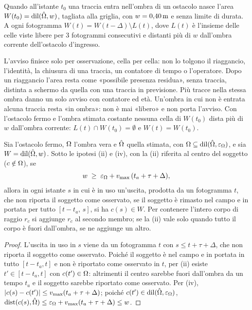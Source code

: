 \begin{definizione}\label{def:occ-avviso}
Quando all'istante $t_0$ una traccia entra nell'ombra di un ostacolo nasce l'area $W(t_0)=\operatorname{dil}(\hat{\Omega},w)$, tagliata alla griglia, con $w=0{,}40\,\mathrm{m}$ e senza limite di durata. A ogni fotogramma $W(t)=W(t-\Delta)\setminus L(t)$, dove $L(t)$ è l'insieme delle celle viste libere per 3 fotogrammi consecutivi e distanti più di $w$ dall'ombra corrente dell'ostacolo d'ingresso.
\end{definizione}

L'avviso finisce solo per osservazione, cella per cella: non lo tolgono il riaggancio, l'identità, la chiusura di una traccia, un contatore di tempo o l'operatore. Dopo un riaggancio l'area resta come «possibile presenza residua», senza traccia, distinta a schermo da quella con una traccia in previsione. Più tracce nella stessa ombra danno un solo avviso con contatore ed età. Un'ombra in cui non è entrata alcuna traccia resta «in ombra»: non è mai «libero» e non porta l'avviso. Con l'ostacolo fermo e l'ombra stimata costante nessuna cella di $W(t_0)$ dista più di $w$ dall'ombra corrente: $L(t)\cap W(t_0)=\emptyset$ e $W(t)=W(t_0)$.

\begin{proposizione}\label{prop:occ-fascia}
Sia l'ostacolo fermo, $\Omega$ l'ombra vera e $\hat{\Omega}$ quella stimata, con $\Omega\subseteq\operatorname{dil}(\hat{\Omega},\varepsilon_\Omega)$, e sia $W=\operatorname{dil}(\hat{\Omega},w)$. Sotto le ipotesi (ii) e (iv), con la (ii) riferita al centro del soggetto ($c\notin\Omega$), se
\begin{equation}\label{eq:occ-fascia}
w\;\ge\;\varepsilon_\Omega+v_{\max}\,(t_a+\tau+\Delta),
\end{equation}
allora in ogni istante $s$ in cui è in uso un'uscita, prodotta da un fotogramma $t$, che non riporta il soggetto come osservato, se il soggetto è rimasto nel campo e in portata per tutto $[t-t_a,\,s]$, si ha $c(s)\in W$. Per contenere l'intero corpo di raggio $r_c$ si aggiunge $r_c$ al secondo membro; se la (ii) vale solo quando tutto il corpo è fuori dall'ombra, se ne aggiunge un altro. 
\end{proposizione}
\begin{proof}
L'uscita in uso in $s$ viene da un fotogramma $t$ con $s\le t+\tau+\Delta$, che non riporta il soggetto come osservato. Poiché il soggetto è nel campo e in portata in tutto $[t-t_a,t]$ e non è riportato come osservato in $t$, per (ii) esiste $t'\in[t-t_a,t]$ con $c(t')\in\Omega$: altrimenti il centro sarebbe fuori dall'ombra da un tempo $t_a$ e il soggetto sarebbe riportato come osservato. Per (iv), $|c(s)-c(t')|\le v_{\max}(t_a+\tau+\Delta)$; poiché $c(t')\in\operatorname{dil}(\hat{\Omega},\varepsilon_\Omega)$, $\operatorname{dist}(c(s),\hat{\Omega})\le\varepsilon_\Omega+v_{\max}(t_a+\tau+\Delta)\le w$.
\end{proof}

